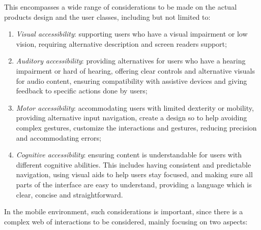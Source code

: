 This encompasses a wide range of considerations to be made on the actual products design and the user classes, including but not limited to:
\begin{enumerate}
    \item \textit{Visual accessibility}: supporting users who have a visual impairment or low vision, requiring alternative description and screen readers support;

    \item \textit{Auditory accessibility}: providing alternatives for users who have a hearing impairment or hard of hearing, offering clear controls and alternative  visuals for audio content, ensuring compatibility with assistive devices and giving feedback to specific actions done by users;

    \item \textit{Motor accessibility}: accommodating users with limited dexterity or mobility, providing alternative input navigation, create a design so to help avoiding complex gestures, customize the interactions and gestures, reducing precision and accommodating errors;

    \item \textit{Cognitive accessibility}: ensuring content is understandable for users with different cognitive abilities. This includes having consistent and predictable navigation, using visual aids to help users stay focused, and making sure all parts of the interface are easy to understand, providing a language which is clear, concise and straightforward.
    
\end{enumerate}

In the mobile environment, such considerations is important, since there is a complex web of interactions to be considered, mainly focusing on two aspects:


